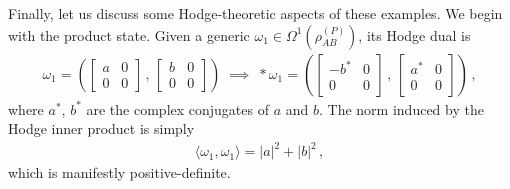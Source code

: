 \documentclass[12pt]{article}
\numberwithin{equation}{section}
\begin{document}
Finally, let us discuss some Hodge-theoretic aspects of these examples. We begin with the product state. Given a generic $\omega_1 \in \Omega^1 ( \rho_{AB}^{(P)} )$, its Hodge dual is
%
\begin{align}
    \omega_1 = \left( \begin{bmatrix} a & 0 \\ 0 & 0 \end{bmatrix} \, , \, \begin{bmatrix} b & 0 \\ 0 & 0 \end{bmatrix} \right) \; \implies \; \ast \omega_1 = \left( \begin{bmatrix} - b^\ast & 0 \\ 0 & 0 \end{bmatrix} \, , \, \begin{bmatrix} a^\ast & 0 \\ 0 & 0 \end{bmatrix} \right) \, ,
\end{align}
%
where $a^\ast$, $b^\ast$ are the complex conjugates of $a$ and $b$. The norm induced by the Hodge inner product is simply
%
\begin{align}
    \langle \omega_1, \omega_1 \rangle = | a |^2 + | b |^2 \, ,
\end{align}
%
which is manifestly positive-definite.
\end{document}
